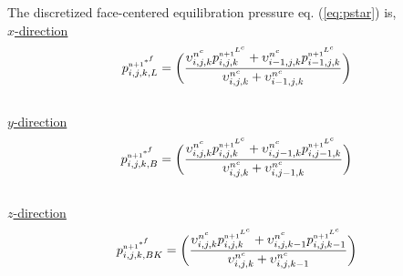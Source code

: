 \documentclass[fleqn]{article}
\begin{document}
{The discretized face-centered equilibration pressure eq. (\ref{eq:pstar}) is, \\
\underline{\textsf{$x$-direction}}
\begin{equation*}
    \pstar_{i,j,k,L} = \biggl{(}\frac{ \spvol_{i,j,k}\pnnLc_{i,j,k} + \spvol_{i-1,j,k} \pnnLc_{i-1,j,k}}{\spvol_{i,j,k} + \spvol_{i-1,j,k} } \biggr{)}
\end{equation*}
%
\normalmarginpar
{}
\\
%
\underline{\textsf{$y$-direction}}
\begin{equation*}
\pstar_{i,j,k,B} = \biggl{(}\frac{ \spvol_{i,j,k}\pnnLc_{i,j,k} + \spvol_{i,j-1,k}\pnnLc_{i,j-1,k}}
{\spvol_{i,j,k} + \spvol_{i,j-1,k} } \biggr{)} 
\end{equation*}
%
%
\\
%
\underline{\textsf{$z$-direction}}
\begin{equation*}
\pstar_{i,j,k,BK} = \biggl{(}\frac{ \spvol_{i,j,k}\pnnLc_{i,j,k} + \spvol_{i,j,k-1}\pnnLc_{i,j,k-1}}
{\spvol_{i,j,k} + \spvol_{i,j,k-1} } \biggr{)}
\end{equation*}
%
\\
%
%
}
\end{document}
